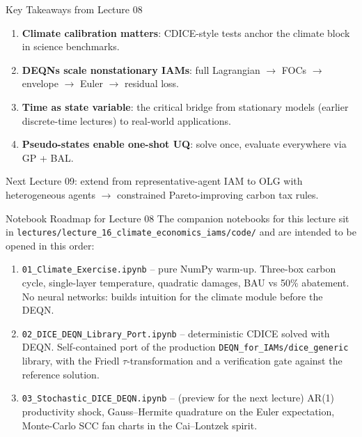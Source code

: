 \documentclass[aspectratio=169,11pt]{beamer}
\newcommand{\emphc}[1]{\textcolor{harvardcrimson}{#1}}
\begin{document}
\begin{frame}{Key Takeaways from Lecture 08}
\begin{enumerate}
    \item \textbf{Climate calibration matters}: CDICE-style tests anchor the climate block in science benchmarks.
    \item \textbf{DEQNs scale nonstationary IAMs}: full Lagrangian $\rightarrow$ FOCs $\rightarrow$ envelope $\rightarrow$ Euler $\rightarrow$ residual loss.
    \item \textbf{Time as state variable}: the critical bridge from stationary models (earlier discrete-time lectures) to real-world applications.
    \item \textbf{Pseudo-states enable one-shot UQ}: solve once, evaluate everywhere via GP + BAL.
\end{enumerate}

\vspace{0.3cm}
\begin{block}{Next}
Lecture 09: extend from representative-agent IAM to \emphc{OLG with heterogeneous agents} $\rightarrow$ constrained Pareto-improving carbon tax rules.
\end{block}
\end{frame}

\begin{frame}{Notebook Roadmap for Lecture 08}
\small
The companion notebooks for this lecture sit in \texttt{lectures/lecture\_16\_climate\_economics\_iams/code/} and are intended to be opened in this order:
\vspace{0.2cm}
\begin{enumerate}
    \item \texttt{01\_Climate\_Exercise.ipynb} -- pure NumPy warm-up. Three-box carbon cycle, single-layer temperature, quadratic damages, BAU vs 50\% abatement. No neural networks: builds intuition for the climate module before the DEQN.
    \item \texttt{02\_DICE\_DEQN\_Library\_Port.ipynb} -- deterministic CDICE solved with DEQN. Self-contained port of the production \texttt{DEQN\_for\_IAMs/dice\_generic} library, with the Friedl $\tau$-transformation and a verification gate against the reference solution.
    \item \texttt{03\_Stochastic\_DICE\_DEQN.ipynb} -- (preview for the next lecture) AR(1) productivity shock, Gauss--Hermite quadrature on the Euler expectation, Monte-Carlo SCC fan charts in the Cai--Lontzek spirit.
\end{enumerate}
\end{frame}
\end{document}
